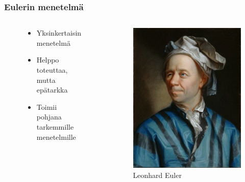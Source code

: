 \documentclass[finnish, 11pt, fleqn]{beamer}
\begin{document}
\begin{frame}
	\frametitle{Eulerin menetelmä}
	\begin{columns}[onlytextwidth]
		\begin{column}{.45\textwidth}
			\begin{figure}
				\vspace{-4em}
    			\begin{itemize}
    				\item{Yksinkertaisin menetelmä}
    				\vspace{0em}
    				\item{Helppo toteuttaa, mutta epätarkka}
					\vspace{1em}    				
    				\item{Toimii pohjana tarkemmille menetelmille}
    			\end{itemize}
			\end{figure}
		\end{column}
		\hfill
		\begin{column}{.55\textwidth}
			\begin{figure}[h!]
				\includegraphics[scale=0.25]{graphics/Leonhard_Euler.jpg}
				{\caption{Leonhard Euler}}
			\end{figure}
		\end{column}
	\end{columns}	
\end{frame}
\end{document}
